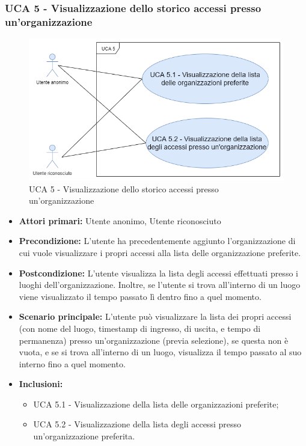 \newpage

\subsubsection{UCA 5 - Visualizzazione dello storico accessi presso un'organizzazione}
\begin{figure}[h]
	\centering	
	\includegraphics[scale=0.5]{sezioni/UseCase/Immagini/UCA5.png}
	\caption{UCA 5 - Visualizzazione dello storico accessi presso un'organizzazione}
\end{figure}

\begin{itemize}
    \item \textbf{Attori primari:} Utente anonimo, Utente riconosciuto
    \item \textbf{Precondizione:} L'utente ha precedentemente aggiunto l'organizzazione di cui vuole visualizzare i propri accessi alla lista delle organizzazione preferite.
    \item \textbf{Postcondizione:} L'utente visualizza la lista degli accessi effettuati presso i luoghi dell'organizzazione. Inoltre, se l'utente si trova all'interno di un luogo viene visualizzato il tempo passato lì dentro fino a quel momento.
    \item \textbf{Scenario principale:} L'utente può visualizzare la lista dei propri accessi (con nome del luogo, timestamp di ingresso, di uscita, e tempo di permanenza) presso un'organizzazione (previa selezione), se questa non è vuota, e se si trova all'interno di un luogo, visualizza il tempo passato al suo interno fino a quel momento.
    \item \textbf{Inclusioni:}
    \begin{itemize}
        \item UCA 5.1 - Visualizzazione della lista delle organizzazioni preferite;
        \item UCA 5.2 - Visualizzazione della lista degli accessi presso un'organizzazione preferita.
    \end{itemize}
\end{itemize}


